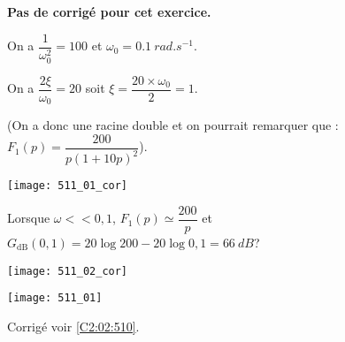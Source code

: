 \normaltrue \difficilefalse \tdifficilefalse
\correctionfalse


\setcounter{numques}{0}
\ifcorrection
\else
\textbf{Pas de corrigé pour cet exercice.}
\fi


\ifprof 
\else
 \fi
 
\ifprof
On a $\dfrac{1}{\omega_0^2} = {100}$ et $\omega_0 = \SI{0,1}{rad.s^{-1}}$.

On a $\dfrac{2\xi}{\omega_0}= {20}$ soit $\xi = \dfrac{20\times \omega_0}{2 }= 1$.

(On a donc une racine double et on pourrait remarquer que : 
$F_1(p)=\dfrac{200}{p\left(1+10p\right)^2}$).

\begin{center}
\texttt{[image: 511\_01\_cor]}
\end{center}

Lorsque $\omega << 0,1$, $F_1(p) \simeq \dfrac{200}{p}$ et $G_{\text{dB}}(0,1) = 20\log 200 - 20 \log 0,1 = \SI{66}{dB}$?
\begin{center}
\texttt{[image: 511\_02\_cor]}
\end{center}

\else 
\begin{center}
\texttt{[image: 511\_01]}
\end{center}
\fi






 

\ifprof
\else
\begin{flushright}
\footnotesize{Corrigé  voir \ref{C2:02:510}.}
\end{flushright}%
\fi